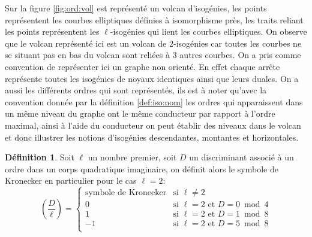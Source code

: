 \documentclass[10pt,a4paper]{book}
\theoremstyle{plain}
\theoremstyle{definition}
\theoremstyle{definition}
\theoremstyle{definition}
\theoremstyle{definition}
\theoremstyle{definition}
\newtheorem{defi}[thm]{Définition}
\theoremstyle{remark}
\theoremstyle{remark}
\theoremstyle{definition}
\begin{document}
Sur la figure \ref{fig:ord:vol} est représenté un volcan d'isogénies, les 
points représentent les courbes elliptiques définies à isomorphisme près, les 
traits reliant les points représentent les $\ell$-isogénies qui lient les 
courbes elliptiques. On observe que le volcan représenté ici est un volcan de 
$2$-isogénies car toutes les courbes ne se situant pas en bas du volcan sont 
reliées à $3$ autres courbes. On a pris comme convention de représenter ici un
graphe non orienté. En effet chaque arrête représente toutes les isogénies de 
noyaux identiques ainsi que leurs duales. On a aussi les différents ordres qui
sont représentés, ils est à noter qu'avec la convention donnée par la définition
\ref{def:iso:nom} les ordres qui apparaissent dans un même niveau du graphe ont
le même conducteur par rapport à l'ordre maximal, ainsi à l'aide du conducteur 
on peut établir des niveaux dans le volcan et donc illustrer les notions 
d'isogénies descendantes, montantes et horizontales. 

\begin{defi}
Soit $\ell$ un nombre premier, soit $D$ un discriminant associé à un ordre dans
un corps quadratique imaginaire, on définit alors le symbole de Kronecker en 
particulier pour le cas $\ell=2$:
\begin{equation*}
\left( \frac{D}{\ell} \right)= \begin{cases}
  \text{symbole de Kronecker} & \text{si } \ell\neq 2 \\
0 & \text{si } \ell=2 \text{ et } D=0 \bmod 4 \\
1 & \text{si } \ell=2 \text{ et } D=1 \bmod 8 \\
-1 & \text{si } \ell=2 \text{ et } D=5 \bmod 8 \\
\end{cases}
\end{equation*}
\end{defi}
\end{document}
